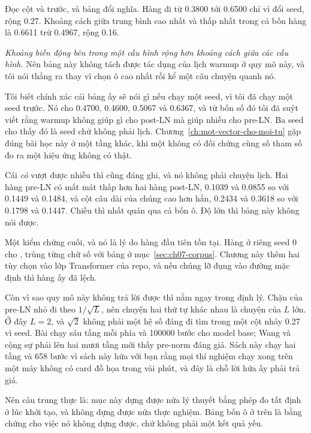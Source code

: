 %
Đọc cột  và  trước, và bảng đổi nghĩa. Hàng
 đi từ 0.3800 tới 0.6500 chỉ vì đổi seed, rộng 0.27. Khoảng
cách giữa trung bình cao nhất và thấp nhất trong cả bốn hàng là 0.6611 trừ
0.4967, rộng 0.16.

\emph{Khoảng biến động bên trong một cấu hình rộng hơn khoảng cách giữa các cấu
hình.} Nên bảng này không tách được tác dụng của lịch warmup ở quy mô này, và
tôi nói thẳng ra thay vì chọn ô cao nhất rồi kể một câu chuyện quanh nó.

Tôi biết chính xác cái bảng ấy sẽ nói gì nếu chạy một seed, vì tôi đã chạy một
seed trước. Nó cho 0.4700, 0.4600, 0.5067 và 0.6367, và từ bốn số đó tôi đã suýt
viết rằng warmup không giúp gì cho post-LN mà giúp nhiều cho pre-LN. Ba seed cho
thấy đó là seed chứ không phải lịch. Chương~\ref{ch:mot-vector-cho-moi-tu} gặp
đúng bài học này ở một tầng khác, khi một  không có
đối chứng cùng số tham số đo ra một hiệu ứng không có thật.

%
Cái \emph{có} vượt được nhiễu thì cũng đáng ghi, và nó không phải chuyện lịch.
Hai hàng pre-LN có mất mát thấp hơn hai hàng post-LN, 0.1039 và 0.0855 so với
0.1449 và 0.1484, và cột câu dài của chúng cao hơn hẳn, 0.2434 và 0.3618 so với
0.1798 và 0.1447. Chiều thì nhất quán qua cả bốn ô. Độ lớn thì bảng này không
nói được.

Một kiểm chứng cuối, và nó là lý do hàng đầu tiên tồn tại. Hàng
 ở riêng seed 0 cho ,
trùng từng chữ số với bảng ở mục~\ref{sec:ch07-corpus}. Chương này thêm hai tùy
chọn vào lớp Transformer của repo, và nếu chúng lỡ đụng vào đường mặc định thì
hàng ấy đã lệch.

%
Còn vì sao quy mô này không trả lời được thì nằm ngay trong định lý. Chặn của
pre-LN nhỏ đi theo \(1/\sqrt{L}\), nên chuyện hai thứ tự khác nhau là chuyện của
\(L\) lớn. Ở đây \(L = 2\), và \(\sqrt{2}\) không phải một hệ số đáng đi tìm
trong một cột nhảy 0.27 vì seed. Bài chạy sáu tầng mỗi phía và 100000 bước cho
model base; Wang
và cộng sự phải lên hai mươi tầng mới thấy pre-norm đáng giá. Sách này chạy hai
tầng và 658 bước vì sách này hứa với bạn rằng mọi thí nghiệm chạy xong trên một
máy không có card đồ họa trong vài phút, và đây là chỗ lời hứa ấy phải trả giá.

Nên câu trung thực là: mục này dựng được nửa lý thuyết bằng phép đo tất định ở
lúc khởi tạo, và không dựng được nửa thực nghiệm. Bảng bốn ô ở trên là bằng
chứng cho việc nó không dựng được, chứ không phải một kết quả yếu.
